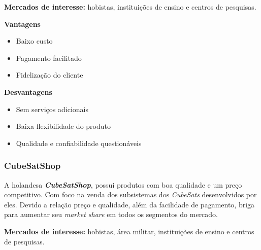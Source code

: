 \documentclass[
	12pt,				%
	openright,			%
	oneside,			%
	a4paper,			%
	english,			%
	french,				%
	spanish,			%
	brazil				%
	]{abntex2}
\begin{document}
	\textbf{Mercados de interesse:} hobistas, instituições de ensino e centros de pesquisas.
	
	\begin{minipage}{7cm}
	\begin{center}
	\textbf{Vantagens}
	\end{center}
	
	\begin{itemize}
	\item Baixo custo
	\item Pagamento facilitado
	\item Fidelização do cliente
	\end{itemize}
	\end{minipage}
	\begin{minipage}{7cm}
	\begin{center}
	\textbf{Desvantagens}
	\end{center}
	
	\begin{itemize}
	\item Sem serviços adicionais
	\item Baixa flexibilidade do produto
	\item Qualidade e confiabilidade questionáveis
	\end{itemize}		
	\end{minipage}
	
\subsubsection[CubeSatShop]{CubeSatShop}
	
	A holandesa \textit{\textbf{CubeSatShop}}, possui produtos com boa qualidade e um preço competitivo. Com foco na venda dos subsistemas dos \textit{CubeSats} desenvolvidos por eles. Devido a relação preço e qualidade, além da facilidade de pagamento, briga para aumentar seu \textit{market share} em todos os segmentos do mercado.
	
	\textbf{Mercados de interesse:} hobistas, área militar, instituições de ensino e centros de pesquisas.
	
\end{document}
